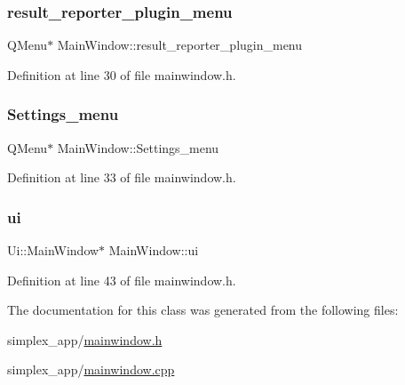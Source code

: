 \subsubsection{\texorpdfstring{result\+\_\+reporter\+\_\+plugin\+\_\+menu}{result\_reporter\_plugin\_menu}}
{\footnotesize\ttfamily Q\+Menu$\ast$ Main\+Window\+::result\+\_\+reporter\+\_\+plugin\+\_\+menu\hspace{0.3cm}{\ttfamily [private]}}



Definition at line 30 of file mainwindow.\+h.

\mbox{\label{classMainWindow_af9d894ce80a9a3beb435198d7c7bcb8d}} 
\subsubsection{\texorpdfstring{Settings\+\_\+menu}{Settings\_menu}}
{\footnotesize\ttfamily Q\+Menu$\ast$ Main\+Window\+::\+Settings\+\_\+menu\hspace{0.3cm}{\ttfamily [private]}}



Definition at line 33 of file mainwindow.\+h.

\mbox{\label{classMainWindow_a35466a70ed47252a0191168126a352a5}} 
\subsubsection{\texorpdfstring{ui}{ui}}
{\footnotesize\ttfamily Ui\+::\+Main\+Window$\ast$ Main\+Window\+::ui\hspace{0.3cm}{\ttfamily [private]}}



Definition at line 43 of file mainwindow.\+h.



The documentation for this class was generated from the following files\+:\begin{DoxyCompactItemize}
\item 
simplex\+\_\+app/\hyperlink{mainwindow_8h}{mainwindow.\+h}\item 
simplex\+\_\+app/\hyperlink{mainwindow_8cpp}{mainwindow.\+cpp}\end{DoxyCompactItemize}
